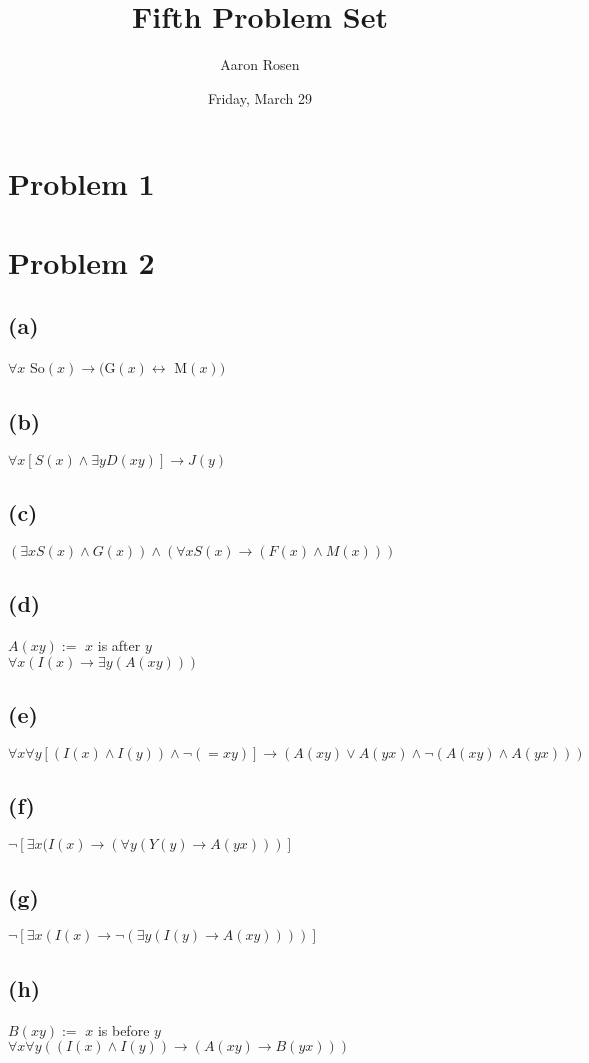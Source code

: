 \documentclass[11pt, a4paper, oneside]{article}
\begin{document}
\title{Fifth Problem Set}
\author{Aaron Rosen}
\date{Friday, March 29}
\maketitle

\section*{Problem 1}

\section*{Problem 2}
\subsection*{(a)}
$\forall x$ So$(x) \to ($G$(x) \leftrightarrow$ M$(x))$
\subsection*{(b)}
$\forall x [S(x) \land \exists y D(xy)] \to J(y)$
\subsection*{(c)}
$(\exists x S(x) \land G(x)) \land (\forall x S(x) \to (F(x) \land M(x)))$
\subsection*{(d)}
$A(xy) :=$ $x$ is after $y$\\
$\forall x (I(x) \to \exists y (A(xy)))$
\subsection*{(e)}
$\forall x \forall y [(I(x) \land I(y)) \land \neg (=xy)] \to (A(xy) \lor A(yx) \land \neg (A(xy) \land A(yx)))$
\subsection*{(f)}
$\neg [\exists x (I(x) \to (\forall y (Y(y) \to A(yx)))]$
\subsection*{(g)}
$\neg [\exists x (I(x) \to \neg (\exists y (I(y) \to A(xy))))]$
\subsection*{(h)}
$B(xy) :=$ $x$ is before $y$\\
$\forall x \forall y ((I(x) \land I(y)) \to (A(xy) \to B(yx)))$
\end{document}
